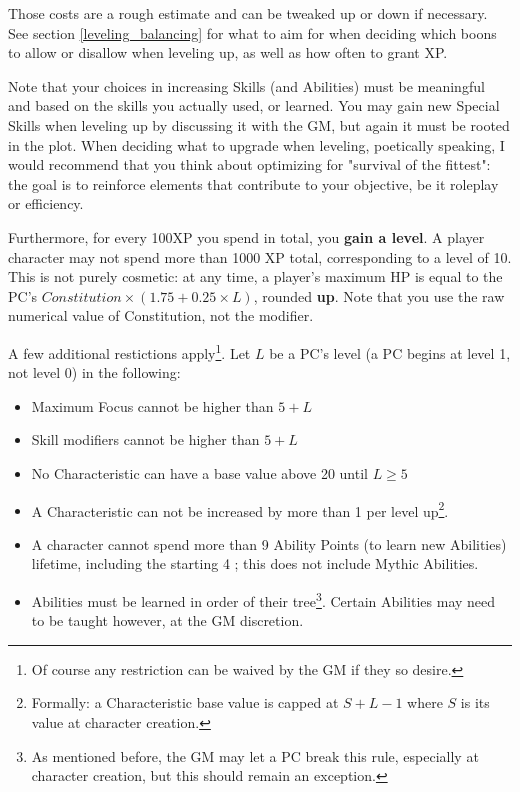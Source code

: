 Those costs are a rough estimate and can be tweaked up or down if necessary. See section \ref{leveling_balancing} for what to aim for when deciding which boons to allow or disallow when leveling up, as well as how often to grant XP.

Note that your choices in increasing Skills (and Abilities) must be meaningful and based on the skills you actually used, or learned. You may gain new Special Skills when leveling up by discussing it with the GM, but again it must be rooted in the plot. When deciding what to upgrade when leveling, poetically speaking, I would recommend that you think about optimizing for "survival of the fittest": the goal is to reinforce elements that contribute to your objective, be it roleplay or efficiency.

Furthermore, for every 100XP you spend in total, you \textbf{gain a level}. A player character may not spend more than 1000 XP total, corresponding to a level of 10. This is not purely cosmetic: at any time, a player's maximum HP is equal to the PC's $Constitution \times (1.75 + 0.25 \times L)$, rounded \textbf{up}. Note that you use the raw numerical value of Constitution, not the modifier.

A few additional restictions apply\footnote{Of course any restriction can be waived by the GM if they so desire.}. Let $L$ be a PC's level (a PC begins at level 1, not level 0) in the following:

\begin{itemize}
	\item Maximum Focus cannot be higher than $5+L$
	\item Skill modifiers cannot be higher than $5+L$
	\item No Characteristic can have a base value above 20 until $L \geq 5$
	\item A Characteristic can not be increased by more than 1 per level up\footnote{Formally: a Characteristic base value is capped at $S + L - 1$ where $S$ is its value at character creation.}.
	\item A character cannot spend more than 9 Ability Points (to learn new Abilities) lifetime, including the starting 4 ; this does not include Mythic Abilities.
	\item Abilities must be learned in order of their tree\footnote{As mentioned before, the GM may let a PC break this rule, especially at character creation, but this should remain an exception.}. Certain Abilities may need to be taught however, at the GM discretion.
\end{itemize}


